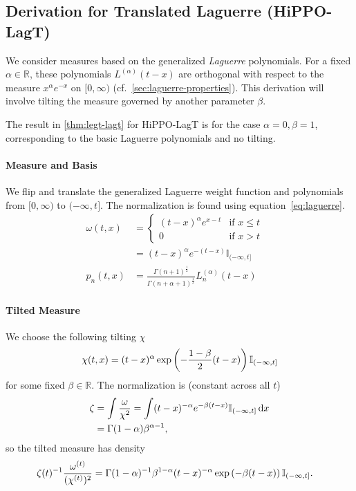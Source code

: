 \documentclass[../../hippo]{subfiles}
\begin{document}
\subsection{Derivation for Translated Laguerre (HiPPO-LagT)}
\label{sec:derivation-lagt}

We consider measures based on the generalized \emph{Laguerre} polynomials.
For a fixed $\alpha \in \mathbb{R}$, these polynomials $L^{(\alpha)}(t-x)$ are
orthogonal with respect to the measure $x^{\alpha} e^{-x}$ on $[0, \infty)$
(cf.\ \cref{sec:laguerre-properties}).
This derivation will involve tilting the measure governed by another parameter $\beta$.

The result in \cref{thm:legt-lagt} for HiPPO-LagT is for the case $\alpha = 0, \beta = 1$,
corresponding to the basic Laguerre polynomials and no tilting.

\paragraph{Measure and Basis}
We flip and translate the generalized Laguerre weight function and polynomials from $[0, \infty)$ to $(-\infty, t]$.
The normalization is found using equation~\eqref{eq:laguerre}.
\begin{align*}
  \omega(t, x) &=
  \begin{cases}
    (t-x)^\alpha e^{x-t} & \mbox{if } x \le t \\
    0 & \mbox{if } x > t
  \end{cases}
  \quad
  \\
  &= (t-x)^\alpha e^{-(t-x)} \mathbb{I}_{(-\infty, t]}
  \\
  p_n(t, x)
  &= \frac{\Gamma(n+1)^{\frac{1}{2}}}{\Gamma(n+\alpha+1)^{\frac{1}{2}}} L^{(\alpha)}_n(t-x)
\end{align*}


\paragraph{Tilted Measure}


We choose the following tilting $\chi$
\begin{align*}%
  \chi(t, x) &= (t-x)^\alpha \exp\left( -\frac{1-\beta}{2} (t-x) \right) \mathbb{I}_{\Rn{t}} \\
\end{align*}
for some fixed $\beta \in \mathbb{R}$.
The normalization is (constant across all $t$)
\begin{align*}%
  \zeta &= \int \frac{\omega}{\chi^2} = \int (t-x)^{-\alpha} e^{-\beta(t-x)} \mathbb{I}_{\Rn{t}} \dd x
  \\
  &= \Gamma(1-\alpha) \beta^{\alpha-1}
  ,
\end{align*}
so the tilted measure has density
\begin{align*}%
  \zeta(t)^{-1} \frac{\omega^{(t)}}{(\chi^{(t)})^2} &= \Gamma(1-\alpha)^{-1} \beta^{1-\alpha} (t-x)^{-\alpha} \exp\left( -\beta(t-x) \right) \mathbb{I}_{\Rn{t}}
  .
\end{align*}
\end{document}
